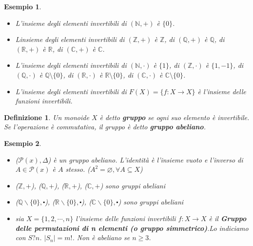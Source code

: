 \documentclass[a4paper,12pt]{article}
\theoremstyle{def}
\newtheorem*{definition}{Definizione}
\theoremstyle{prop}
\theoremstyle{esempio}
\newtheorem*{example}{Esempio}
\theoremstyle{dimostrazione}
\theoremstyle{teo}
\theoremstyle{osservazione}
\begin{document}
\begin{example}
	\
	\begin{itemize}
		\item L'insieme degli elementi invertibili di \((\mathbb{N},+)\) è \(\{0\}\).
		\item Linsieme degli elementi invertibili di \((\mathbb{Z},+)\) è \(\mathbb{Z}\), di \((\mathbb{Q},+)\)
		      è \(\mathbb{Q}\), di \((\mathbb{R},+)\) è \(\mathbb{R}\), di \((\mathbb{C},+)\) è \(\mathbb{C}\).
		\item L'insieme degli elementi invertibili di \((\mathbb{N},\cdot)\) è \(\{1\}\), di \((\mathbb{Z},\cdot)\)
		      è \(\{1,-1\}\), di \((\mathbb{Q},\cdot)\) è \(\mathbb{Q} \setminus \{0\}\), di \((\mathbb{R},\cdot)\) è
		      \(\mathbb{R} \setminus \{0\}\), di \((\mathbb{C},\cdot)\) è \(\mathbb{C} \setminus \{0\}\).
		\item L'insieme degli elementi invertibili di \(F(X) = \{f: X \rightarrow X\}\) è l'insieme delle funzioni
		      invertibili.
	\end{itemize}
\end{example}

\begin{definition}
	Un monoide \(X\) è detto \textbf{gruppo} se ogni suo elemento è invertibile. Se l'operazione è
	commutativa, il gruppo è detto \textbf{gruppo abeliano}.
\end{definition}

\begin{example}
	\
	\begin{itemize}
		\item (\(\mathcal{P}(x) ,\Delta \)) è un gruppo abeliano. L'identità è l'insieme vuoto e l'inverso
		      di \(A \in \mathcal{P}(x)\) è \(A\) stesso. (\(A^2 = \varnothing,  \forall A \subseteq X \))
		\item (\(\mathbb{Z},+\)), (\(\mathbb{Q},+\)), (\(\mathbb{R},+\)), (\(\mathbb{C},+\)) sono gruppi abeliani
		\item (\(\mathbb{Q}\backslash \{0\}, \centerdot\)), (\(\mathbb{R}\backslash \{0\}, \centerdot\)),
		      (\(\mathbb{C}\backslash \{0\}, \centerdot\)) sono gruppi abeliani
		\item sia \(X= \{1,2,\cdots,n\}\) l'insieme delle funzioni invertibili \(f:X \rightarrow X\) è il
		      \textbf{Gruppo delle permutazioni di n elementi (o gruppo simmetrico)}.Lo indiciamo con \(S?n\).
		      \(|S_n| = m!\). Non è abeliano se \(n \geq 3\).
	\end{itemize}
\end{example}
\end{document}
